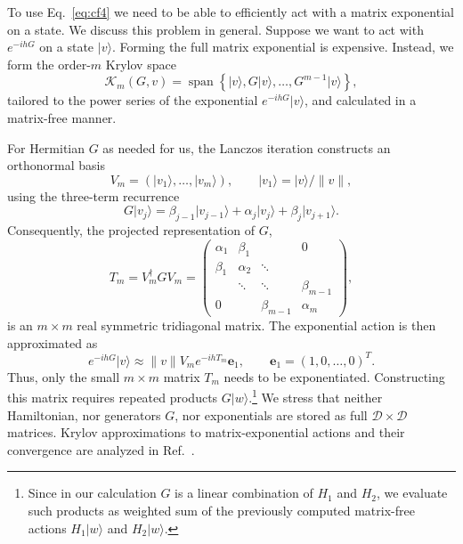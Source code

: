 \documentclass[a4paper,12pt]{article}
\theoremstyle{remark}
\theoremstyle{theorem}
\begin{document}
To use Eq.~\eqref{eq:cf4} we need to be able to efficiently act with a matrix exponential on a state. We discuss this problem in general. Suppose we want to act with $e^{-i h G}$ on a state $|v\rangle$. Forming the full matrix exponential is expensive.
Instead, we form the order-$m$ Krylov space
\begin{equation}
\mathcal K_m(G,v)=\operatorname{span}\left\{
\vert v\rangle,G\vert v\rangle,\ldots,G^{m-1}\vert v\rangle
\right\},
\label{eq:krylovspace}
\end{equation}
tailored to the power series of the exponential $e^{-i h G}\vert v\rangle$, and calculated in a matrix-free manner. 

For Hermitian $G$ as needed for us, the Lanczos iteration constructs an orthonormal basis
\begin{equation}
V_m=(\vert v_1\rangle,\ldots,\vert v_m\rangle),
\qquad
\vert v_1\rangle={\vert v\rangle}/{\lVert v\rVert},
\end{equation}
using the three-term recurrence \cite{Lanczos1950}
\begin{equation}
G\vert v_j\rangle
=\beta_{j-1}\vert v_{j-1}\rangle
+\alpha_j\vert v_j\rangle
+\beta_j\vert v_{j+1}\rangle.
\label{eq:lanczosrecurrence}
\end{equation}
Consequently, the projected representation of $G$,
\begin{equation}
T_m=V_m^\dagger G V_m
=
\begin{pmatrix}
\alpha_1&\beta_1&&0\\
\beta_1&\alpha_2&\ddots&\\
&\ddots&\ddots&\beta_{m-1}\\
0&&\beta_{m-1}&\alpha_m
\end{pmatrix},
\label{eq:tridiagonal}
\end{equation}
is an $m\times m$ real symmetric tridiagonal matrix. 
The exponential action is then approximated as \cite{HochbruckLubich1997}
\begin{equation}
e^{-i h G}\vert v\rangle
\approx 
\lVert v\rVert V_m e^{-i h T_m} \mathbf e_1,
\qquad
\mathbf e_1=(1,0,\ldots,0)^T.
\label{eq:krylovexp}
\end{equation}
Thus, only the small $m\times m$ matrix $T_m$ needs to be exponentiated.  Constructing this matrix requires repeated products $G\vert w\rangle$.\footnote{Since in our calculation $G$ is a linear combination of $H_1$ and $H_2$, we evaluate such products as weighted sum of the previously computed matrix-free actions $H_1\vert w\rangle$ and $H_2\vert w\rangle$.} We stress that neither Hamiltonian, nor generators $G$, nor exponentials are stored as full $\mathcal{D}\times \mathcal{D}$ matrices.  Krylov approximations to matrix-exponential actions and their convergence are analyzed in Ref.~\cite{HochbruckLubich1997}.
\end{document}
